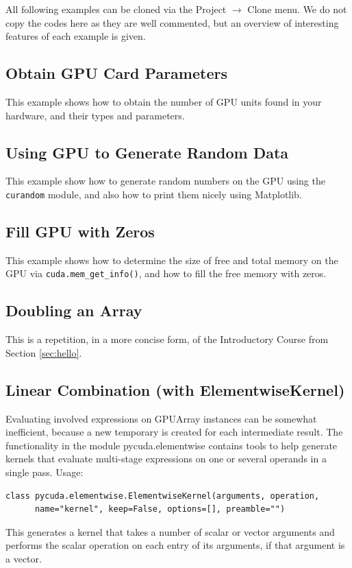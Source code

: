 \documentclass[article,A4,12pt]{llncs}
\begin{document}
All following examples can be cloned via the Project $\rightarrow$ Clone menu.
We do not copy the codes here as they are well commented, but an overview of 
interesting features of each example is given.

\subsection{Obtain GPU Card Parameters}

This example shows how to obtain the number of GPU units found in your hardware, and 
their types and parameters. 

\subsection{Using GPU to Generate Random Data}

This example show how to generate random numbers on the GPU using the {\tt curandom}
module, and also how to print them nicely using Matplotlib.

\subsection{Fill GPU with Zeros}

This example shows how to determine the size of free and total 
memory on the GPU via {\tt cuda.mem\_get\_info()}, and how to fill 
the free memory with zeros.

\subsection{Doubling an Array}

This is a repetition, in a more concise form, of the Introductory Course
from Section \ref{sec:hello}.

\subsection{Linear Combination (with ElementwiseKernel)}

Evaluating involved expressions on GPUArray instances can be somewhat inefficient, because a new temporary is created for each intermediate result. The functionality in the module pycuda.elementwise contains tools to help generate kernels that evaluate multi-stage expressions on one or several operands in a single pass. Usage:

\begin{verbatim}
class pycuda.elementwise.ElementwiseKernel(arguments, operation, 
      name="kernel", keep=False, options=[], preamble="")
\end{verbatim}
This generates a kernel that takes a number of scalar or vector arguments and performs the scalar operation on each entry of its arguments, if that argument is a vector.
\end{document}
